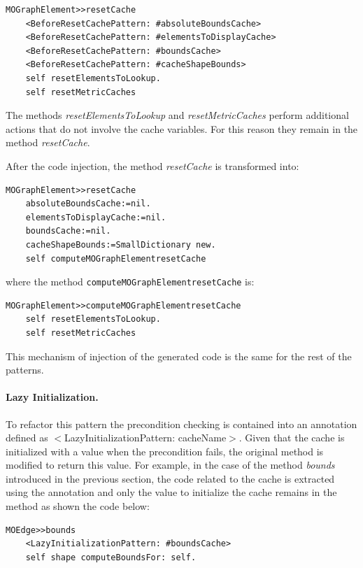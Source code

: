 \documentclass[preprint,10pt]{sigplanconf}
\newcommand{\ct}{\lstinline[backgroundcolor=\color{white},basicstyle=\footnotesize\ttfamily]}
\begin{document}
\begin{lstlisting} 
MOGraphElement>>resetCache 
	<BeforeResetCachePattern: #absoluteBoundsCache> 
	<BeforeResetCachePattern: #elementsToDisplayCache>
	<BeforeResetCachePattern: #boundsCache> 
	<BeforeResetCachePattern: #cacheShapeBounds> 
	self resetElementsToLookup. 
	self resetMetricCaches
\end{lstlisting}

The methods \emph{resetElementsToLookup} and \emph{resetMetricCaches} perform additional actions that do not involve the cache variables. For this reason they remain in the method \emph{resetCache}.

After the code injection, the method \emph{resetCache} is transformed into:

\begin{lstlisting} 
MOGraphElement>>resetCache 
	absoluteBoundsCache:=nil.
	elementsToDisplayCache:=nil. 
	boundsCache:=nil. 
	cacheShapeBounds:=SmallDictionary new. 
	self computeMOGraphElementresetCache 
\end{lstlisting}

where the method \ct{computeMOGraphElementresetCache} is:

\begin{lstlisting} 
MOGraphElement>>computeMOGraphElementresetCache
	self resetElementsToLookup. 
	self resetMetricCaches 
\end{lstlisting}

This mechanism of injection of the generated code is the same for
the rest of the patterns.

\paragraph{Lazy Initialization.} To refactor this pattern
the precondition checking is contained into an annotation defined as
$<$LazyInitializationPattern: cacheName$>$. Given that
the cache is initialized with a value when the precondition fails,
the original method is modified to return this value. For example,
in the case of the method \emph{bounds} introduced in the previous
section, the code related to the cache is extracted using the annotation
and only the value to initialize the cache remains in the method as
shown the code below:

\begin{lstlisting} 
MOEdge>>bounds 
	<LazyInitializationPattern: #boundsCache> 
	self shape computeBoundsFor: self. 
\end{lstlisting}
\end{document}
